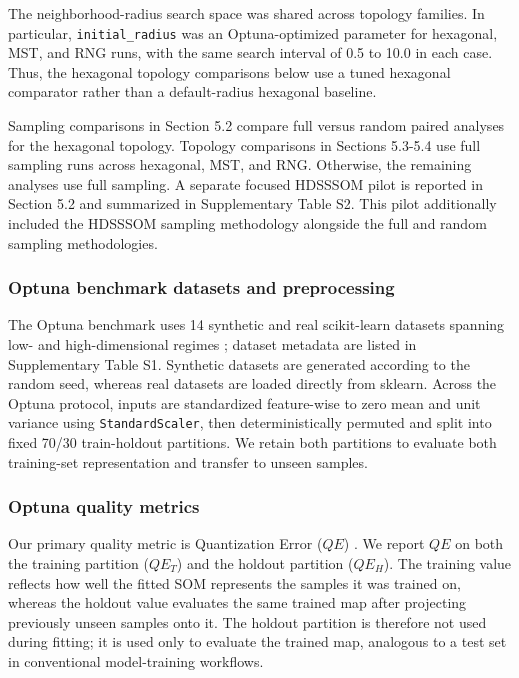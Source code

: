 \documentclass[10pt]{article} %
\begin{document}
The neighborhood-radius search space was shared across topology families. In particular, \texttt{initial\_radius} was an Optuna-optimized parameter for hexagonal, MST, and RNG runs, with the same search interval of 0.5 to 10.0 in each case. Thus, the hexagonal topology comparisons below use a tuned hexagonal comparator rather than a default-radius hexagonal baseline.

Sampling comparisons in Section 5.2 compare full versus random paired analyses for the hexagonal topology. Topology comparisons in Sections 5.3-5.4 use full sampling runs across hexagonal, MST, and RNG. Otherwise, the remaining analyses use full sampling. A separate focused HDSSSOM pilot is reported in Section 5.2 and summarized in Supplementary Table S2. This pilot additionally included the HDSSSOM sampling methodology alongside the full and random sampling methodologies.

\subsubsection{Optuna benchmark datasets and preprocessing}

The Optuna benchmark uses 14 synthetic and real scikit-learn datasets spanning low- and high-dimensional regimes \citep{pedregosaScikitlearnMachineLearning2011}; dataset metadata are listed in Supplementary Table S1. Synthetic datasets are generated according to the random seed, whereas real datasets are loaded directly from sklearn. Across the Optuna protocol, inputs are standardized feature-wise to zero mean and unit variance using \texttt{StandardScaler}, then deterministically permuted and split into fixed 70/30 train-holdout partitions. We retain both partitions to evaluate both training-set representation and transfer to unseen samples.

\subsubsection{Optuna quality metrics}

Our primary quality metric is Quantization Error ($QE$) \citep{kohonenSelfOrganizingMaps2001}. We report $QE$ on both the training partition ($QE_T$) and the holdout partition ($QE_H$). The training value reflects how well the fitted SOM represents the samples it was trained on, whereas the holdout value evaluates the same trained map after projecting previously unseen samples onto it. The holdout partition is therefore not used during fitting; it is used only to evaluate the trained map, analogous to a test set in conventional model-training workflows.
\end{document}
